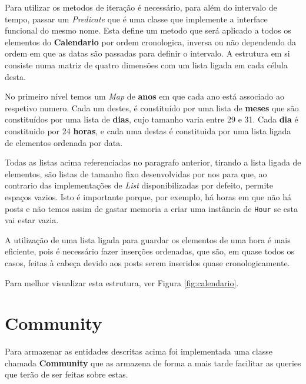 \documentclass[10pt,a4paper]{report}
\begin{document}
        Para utilizar os metodos de iteração é necessário, para além do
        intervalo de tempo, passar um \textit{Predicate} que é uma classe que
        implemente a interface funcional do mesmo nome. Esta define um metodo
        que será aplicado a todos os elementos do \textbf{Calendario} por ordem
        cronologica, inversa ou não dependendo da ordem em que as datas são
        passadas para definir o intervalo.
        A estrutura em si consiste numa matriz de quatro dimensões com um lista
        ligada em cada célula desta.

        No primeiro nível temos um \textit{Map} de \textbf{anos} em que cada ano
        está associado ao respetivo numero. Cada um destes, é constituído por
        uma lista de \textbf{meses} que são constituídos por uma lista de
        \textbf{dias}, cujo tamanho varia entre 29 e 31. Cada \textbf{dia} é
        constituido por 24 \textbf{horas}, e cada uma destas é constituida por
        uma lista ligada de elementos ordenada por data.

        Todas as listas acima referenciadas no paragrafo anterior, tirando a
        lista ligada de elementos, são listas de tamanho fixo desenvolvidas por
        nos %
        para que, ao contrario das implementações de \textit{List}
        disponibilizadas por defeito, permite espaços vazios. Isto é importante
        porque, por exemplo, há horas em que não há posts e não temos assim de
        gastar memoria a criar uma instância de \texttt{Hour} se esta
        vai estar vazia.

        A utilização de uma lista ligada para guardar os elementos de uma hora é
        mais eficiente, pois é necessário fazer inserções ordenadas, que são, em
        quase todos os casos, feitas à cabeça devido aos posts serem inseridos
        quase cronologicamente.

        Para melhor visualizar esta estrutura, ver Figura \ref{fig:calendario}.

    \section{Community}
    Para armazenar as entidades descritas acima foi implementada uma classe
    chamada \textbf{Community} que as armazena de forma a mais tarde facilitar
    as queries que terão de ser feitas sobre estas.
\end{document}
